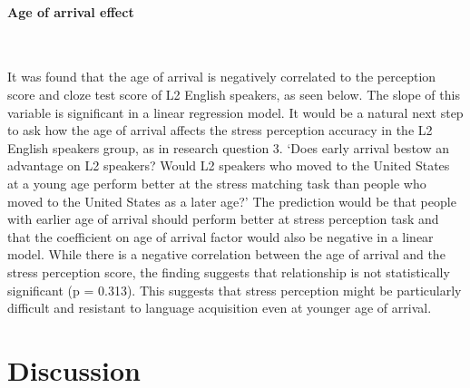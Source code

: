 \documentclass[a4paper]{article}
\begin{document}
\paragraph{Age of arrival effect} \

It was found that the age of arrival is negatively correlated to the perception score and cloze test score of L2 English speakers, as seen below. The slope of this variable is significant in a linear regression model. It would be a natural next step to ask how the age of arrival affects the stress perception accuracy in the L2 English speakers group, as in research question 3. `Does early arrival bestow an advantage on L2 speakers? Would L2 speakers who moved to the United States at a young age perform better at the stress matching task than people who moved to the United States as a later age?' The prediction would be that people with earlier age of arrival should perform better at stress perception task and that the coefficient on age of arrival factor would also be negative in a linear model. While there is a negative correlation between the age of arrival and the stress perception score, the finding suggests that relationship is not statistically significant (p = 0.313). This suggests that stress perception might be particularly difficult and resistant to language acquisition even at younger age of arrival.






\section{Discussion}
\end{document}
